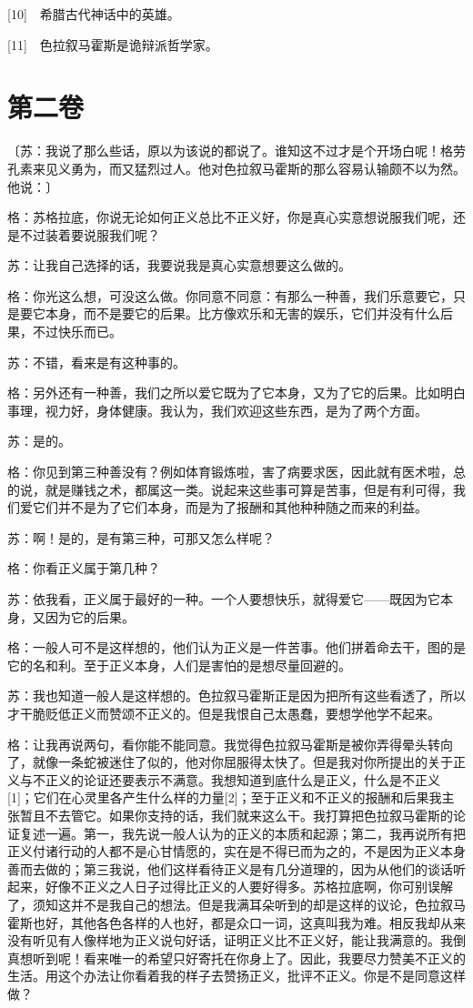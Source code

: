 \documentclass[12pt,oneside]{book}
\begin{document}
[10]　希腊古代神话中的英雄。

[11]　色拉叙马霍斯是诡辩派哲学家。





\chapter{第二卷}

〔苏：我说了那么些话，原以为该说的都说了。谁知这不过才是个开场白呢！格劳孔素来见义勇为，而又猛烈过人。他对色拉叙马霍斯的那么容易认输颇不以为然。他说：〕

格：苏格拉底，你说无论如何正义总比不正义好，你是真心实意想说服我们呢，还是不过装着要说服我们呢？

苏：让我自己选择的话，我要说我是真心实意想要这么做的。

格：你光这么想，可没这么做。你同意不同意：有那么一种善，我们乐意要它，只是要它本身，而不是要它的后果。比方像欢乐和无害的娱乐，它们并没有什么后果，不过快乐而已。

苏：不错，看来是有这种事的。

格：另外还有一种善，我们之所以爱它既为了它本身，又为了它的后果。比如明白事理，视力好，身体健康。我认为，我们欢迎这些东西，是为了两个方面。

苏：是的。

格：你见到第三种善没有？例如体育锻炼啦，害了病要求医，因此就有医术啦，总的说，就是赚钱之术，都属这一类。说起来这些事可算是苦事，但是有利可得，我们爱它们并不是为了它们本身，而是为了报酬和其他种种随之而来的利益。

苏：啊！是的，是有第三种，可那又怎么样呢？

格：你看正义属于第几种？

苏：依我看，正义属于最好的一种。一个人要想快乐，就得爱它——既因为它本身，又因为它的后果。

格：一般人可不是这样想的，他们认为正义是一件苦事。他们拼着命去干，图的是它的名和利。至于正义本身，人们是害怕的是想尽量回避的。

苏：我也知道一般人是这样想的。色拉叙马霍斯正是因为把所有这些看透了，所以才干脆贬低正义而赞颂不正义的。但是我恨自己太愚蠢，要想学他学不起来。

格：让我再说两句，看你能不能同意。我觉得色拉叙马霍斯是被你弄得晕头转向了，就像一条蛇被迷住了似的，他对你屈服得太快了。但是我对你所提出的关于正义与不正义的论证还要表示不满意。我想知道到底什么是正义，什么是不正义[1]；它们在心灵里各产生什么样的力量[2]；至于正义和不正义的报酬和后果我主张暂且不去管它。如果你支持的话，我们就来这么干。我打算把色拉叙马霍斯的论证复述一遍。第一，我先说一般人认为的正义的本质和起源；第二，我再说所有把正义付诸行动的人都不是心甘情愿的，实在是不得已而为之的，不是因为正义本身善而去做的；第三我说，他们这样看待正义是有几分道理的，因为从他们的谈话听起来，好像不正义之人日子过得比正义的人要好得多。苏格拉底啊，你可别误解了，须知这并不是我自己的想法。但是我满耳朵听到的却是这样的议论，色拉叙马霍斯也好，其他各色各样的人也好，都是众口一词，这真叫我为难。相反我却从来没有听见有人像样地为正义说句好话，证明正义比不正义好，能让我满意的。我倒真想听到呢！看来唯一的希望只好寄托在你身上了。因此，我要尽力赞美不正义的生活。用这个办法让你看着我的样子去赞扬正义，批评不正义。你是不是同意这样做？
\end{document}

